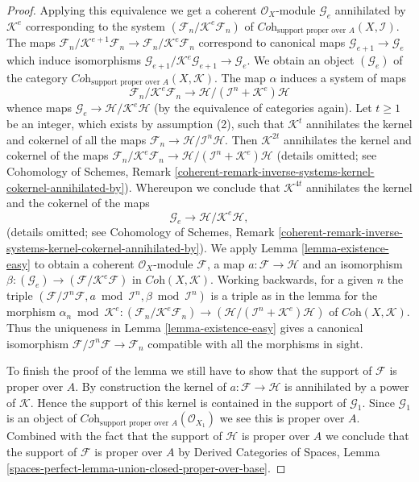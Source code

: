\begin{proof}
\medskip\noindent
Applying this equivalence we get a coherent $\mathcal{O}_X$-module
$\mathcal{G}_e$ annihilated by $\mathcal{K}^e$ corresponding to the system
$(\mathcal{F}_n/\mathcal{K}^e\mathcal{F}_n)$ of
$\textit{Coh}_{\text{support proper over } A}(X, \mathcal{I})$. The maps
$\mathcal{F}_n/\mathcal{K}^{e + 1}\mathcal{F}_n \to
\mathcal{F}_n/\mathcal{K}^e\mathcal{F}_n$ correspond to canonical maps
$\mathcal{G}_{e + 1} \to \mathcal{G}_e$ which induce isomorphisms
$\mathcal{G}_{e + 1}/\mathcal{K}^e\mathcal{G}_{e + 1} \to \mathcal{G}_e$.
We obtain an object $(\mathcal{G}_e)$ of the category
$\textit{Coh}_{\text{support proper over } A}(X, \mathcal{K})$.
The map $\alpha$ induces a system of maps
$$
\mathcal{F}_n/\mathcal{K}^e\mathcal{F}_n
\longrightarrow
\mathcal{H}/(\mathcal{I}^n + \mathcal{K}^e)\mathcal{H}
$$
whence maps $\mathcal{G}_e \to \mathcal{H}/\mathcal{K}^e\mathcal{H}$
(by the equivalence of categories again).
Let $t \geq 1$ be an integer, which exists by assumption (2),
such that $\mathcal{K}^t$ annihilates the kernel and cokernel of all the maps
$\mathcal{F}_n \to \mathcal{H}/\mathcal{I}^n\mathcal{H}$.
Then $\mathcal{K}^{2t}$ annihilates the kernel and cokernel of the maps
$\mathcal{F}_n/\mathcal{K}^e\mathcal{F}_n \to
\mathcal{H}/(\mathcal{I}^n + \mathcal{K}^e)\mathcal{H}$
(details omitted; see Cohomology of Schemes,
Remark \ref{coherent-remark-inverse-systems-kernel-cokernel-annihilated-by}).
Whereupon we conclude that $\mathcal{K}^{4t}$ annihilates the kernel and
the cokernel of the maps
$$
\mathcal{G}_e
\longrightarrow
\mathcal{H}/\mathcal{K}^e\mathcal{H},
$$
(details omitted;  see Cohomology of Schemes,
Remark \ref{coherent-remark-inverse-systems-kernel-cokernel-annihilated-by}).
We apply Lemma \ref{lemma-existence-easy} to obtain a coherent
$\mathcal{O}_X$-module $\mathcal{F}$, a map
$a : \mathcal{F} \to \mathcal{H}$ and an isomorphism
$\beta : (\mathcal{G}_e) \to (\mathcal{F}/\mathcal{K}^e\mathcal{F})$
in $\textit{Coh}(X, \mathcal{K})$. Working backwards, for a given $n$
the triple
$(\mathcal{F}/\mathcal{I}^n\mathcal{F}, a \bmod \mathcal{I}^n, \beta
\bmod \mathcal{I}^n)$ is a triple as in the lemma for the morphism
$\alpha_n \bmod \mathcal{K}^e :
(\mathcal{F}_n/\mathcal{K}^e\mathcal{F}_n) \to
(\mathcal{H}/(\mathcal{I}^n + \mathcal{K}^e)\mathcal{H})$
of $\textit{Coh}(X, \mathcal{K})$. Thus the uniqueness in
Lemma \ref{lemma-existence-easy}
gives a canonical isomorphism
$\mathcal{F}/\mathcal{I}^n\mathcal{F} \to \mathcal{F}_n$
compatible with all the morphisms in sight.

\medskip\noindent
To finish the proof of the lemma we still have to show that the
support of $\mathcal{F}$ is proper over $A$.
By construction the kernel of $a : \mathcal{F} \to \mathcal{H}$
is annihilated by a power of $\mathcal{K}$. Hence the support of
this kernel is contained in the support of $\mathcal{G}_1$. Since
$\mathcal{G}_1$ is an object of
$\textit{Coh}_{\text{support proper over } A}(\mathcal{O}_{X_1})$
we see this is proper over $A$. Combined with the fact that the
support of $\mathcal{H}$ is proper over $A$ we conclude that the
support of $\mathcal{F}$ is proper over $A$ by
Derived Categories of Spaces, Lemma
\ref{spaces-perfect-lemma-union-closed-proper-over-base}.
\end{proof}

